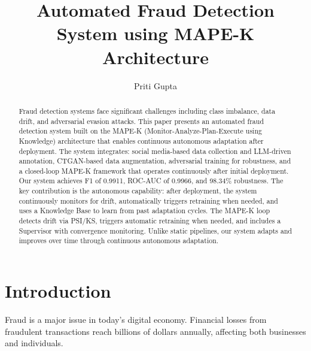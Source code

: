 \documentclass{svproc}
\begin{document}
\mainmatter

\title{Automated Fraud Detection System using MAPE-K Architecture}


\author{Priti Gupta}



\maketitle

\begin{abstract}
Fraud detection systems face significant challenges including class imbalance, data drift, and adversarial evasion attacks. This paper presents an automated fraud detection system built on the MAPE-K (Monitor-Analyze-Plan-Execute using Knowledge) architecture that enables continuous autonomous adaptation after deployment. The system integrates: social media-based data collection and LLM-driven annotation, CTGAN-based data augmentation, adversarial training for robustness, and a closed-loop MAPE-K framework that operates continuously after initial deployment. Our system achieves F1 of 0.9911, ROC-AUC of 0.9966, and 98.34\% robustness. The key contribution is the autonomous capability: after deployment, the system continuously monitors for drift, automatically triggers retraining when needed, and uses a Knowledge Base to learn from past adaptation cycles. The MAPE-K loop detects drift via PSI/KS, triggers automatic retraining when needed, and includes a Supervisor with convergence monitoring. Unlike static pipelines, our system adapts and improves over time through continuous autonomous adaptation.

\end{abstract}

\section{Introduction}\label{sec:intro}
Fraud is a major issue in today's digital economy. Financial losses from fraudulent transactions reach billions of dollars annually, affecting both businesses and individuals. 
\end{document}
